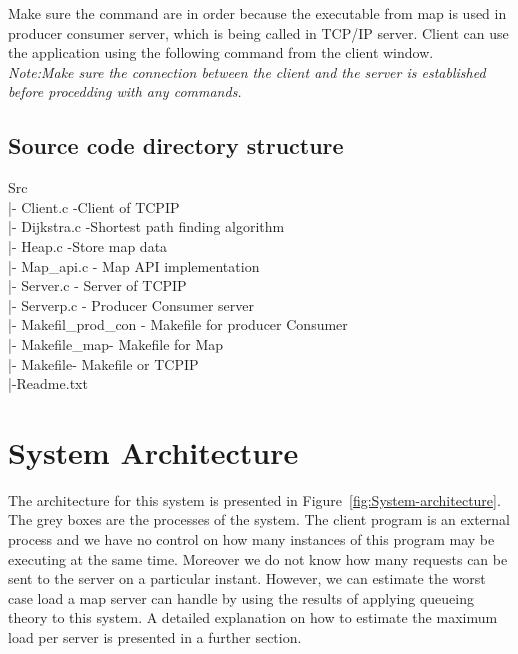 \documentclass[10pt]{article}
\begin{document}
Make sure the command are in order because the executable from map is used in producer consumer server, which is being called in TCP/IP server. Client can use the application using the following command from the client window.\\
\textit{ Note:Make sure the connection between the client and the server is established before procedding with any commands.}

\subsection{Source code directory structure}

Src \\
|- Client.c -Client of TCPIP\\
|- Dijkstra.c -Shortest path finding algorithm\\
|- Heap.c -Store map data \\
|- Map\_api.c - Map API implementation \\
|- Server.c - Server of TCPIP\\
|- Serverp.c - Producer Consumer server \\
|- Makefil\_prod\_con - Makefile for producer Consumer \\
|- Makefile\_map- Makefile for Map\\
|- Makefile- Makefile or TCPIP\\
|-Readme.txt\\



\section{System Architecture}
The architecture for this system is presented in
Figure~\ref{fig:System-architecture}.  The grey boxes are
the processes of the system. The client program is an external process and we
have no control on how many instances of this program may be executing at the
same time. Moreover we do not know how many requests can be sent to the server
on a particular instant. However, we can estimate the worst case load a map
server can handle by using the results of applying queueing theory to this
system. A detailed explanation on how to estimate the maximum load per server is
presented in a further section.
\end{document}
